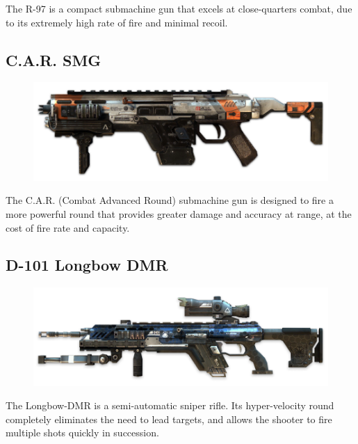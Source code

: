 \documentclass[9pt, openany]{extbook}
\begin{document}
The R-97 is a compact submachine gun that excels at close-quarters combat, due to its extremely high rate of fire and minimal recoil.

\subsection{C.A.R. SMG}
\begin{figure}
\vspace*{-2em}
\includegraphics[width=\linewidth]{CARSMG}
\end{figure}

The C.A.R. (Combat Advanced Round) submachine gun is designed to fire a more powerful round that provides greater damage and accuracy at range, at the cost of fire rate and capacity.


\subsection{D-101 Longbow DMR}
\begin{figure}
\vspace*{-2em}
\includegraphics[width=\linewidth]{LongbowDMRSniper}
\end{figure}

The Longbow-DMR is a semi-automatic sniper rifle. Its hyper-velocity round completely eliminates the need to lead targets, and allows the shooter to fire multiple shots quickly in succession.
\end{document}

